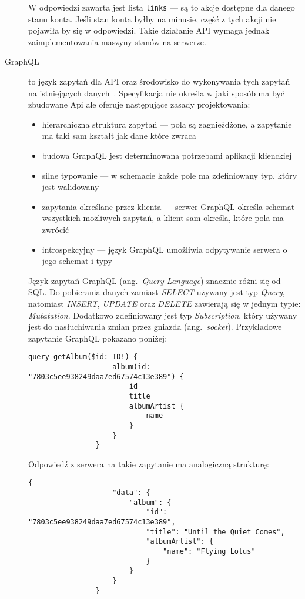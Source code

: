 \begin{description}
			W odpowiedzi zawarta jest lista \verb|links| --- są to akcje dostępne dla danego stanu konta.
			Jeśli stan konta byłby na minusie, część z tych akcji nie pojawiła by się w odpowiedzi.
			Takie działanie API wymaga jednak zaimplementowania maszyny stanów na serwerze.

		\item[GraphQL] to język zapytań dla API oraz środowisko do wykonywania tych zapytań na istniejących danych~\cite{GQLsite}.
			Specyfikacja nie określa w jaki sposób ma być zbudowane Api ale oferuje następujące zasady projektowania\cite{GQLspec}:
			\begin{itemize}
				\item hierarchiczna struktura zapytań --- pola są zagnieżdżone, a zapytanie ma taki sam kształt jak dane które zwraca
				\item budowa GraphQL jest determinowana potrzebami aplikacji klienckiej
				\item silne typowanie --- w schemacie każde pole ma zdefiniowany typ, który jest walidowany
				\item zapytania określane przez klienta --- serwer GraphQL określa schemat wszystkich możliwych zapytań,
					a klient sam określa, które pola ma zwrócić
				\item introspekcyjny --- język GraphQL umożliwia odpytywanie serwera o jego schemat i typy
			\end{itemize}

			Język zapytań GraphQL (ang.\ \emph{Query Language}) znacznie różni się od SQL.
			Do pobierania danych zamiast \emph{SELECT} używany jest typ \emph{Query},
			natomiast \emph{INSERT}, \emph{UPDATE} oraz \emph{DELETE} zawierają się w jednym typie: \emph{Mutatation}.
			Dodatkowo zdefiniowany jest typ \emph{Subscription}, który używany jest do nasłuchiwania zmian przez gniazda (ang.\ \emph{socket}).
			Przykładowe zapytanie GraphQL pokazano poniżej:

			\begin{lstlisting}[label=lst:gqlQuery]
				query getAlbum($id: ID!) {
					album(id: "7803c5ee938249daa7ed67574c13e389") {
						id
						title
						albumArtist {
							name
						}
					}
				}
			\end{lstlisting}
			
			Odpowiedź z serwera na takie zapytanie ma analogiczną strukturę:

			\begin{lstlisting}[label=lst:gqlQueryRes]
				{
					"data": {
						"album": {
							"id": "7803c5ee938249daa7ed67574c13e389",
							"title": "Until the Quiet Comes",
							"albumArtist": {
								"name": "Flying Lotus"
							}
						}
					}
				}
			\end{lstlisting}


\end{description}
